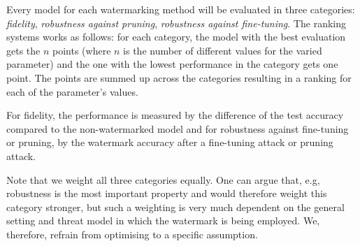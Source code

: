 Every model for each watermarking method will be evaluated in three categories: \textit{fidelity}, \textit{robustness against pruning}, \textit{robustness against fine-tuning}. The ranking systems works as follows: for each category, the model with the best evaluation gets the $n$ points (where $n$ is the number of different values for the varied parameter) and the one with the lowest performance in the category gets one point. The points are summed up across the categories resulting in a ranking for each of the parameter's values. 

For fidelity, the performance is measured by the difference of the test accuracy compared to the non-watermarked model and for robustness against fine-tuning or pruning, by the watermark accuracy after a fine-tuning attack or pruning attack.

Note that we weight all three categories equally. One can argue that, e.g, robustness is the most important property and would therefore weight this category stronger, but such a weighting is very much dependent on the general setting and threat model in which the watermark is being employed. We, therefore, refrain from optimising to a specific assumption. 






